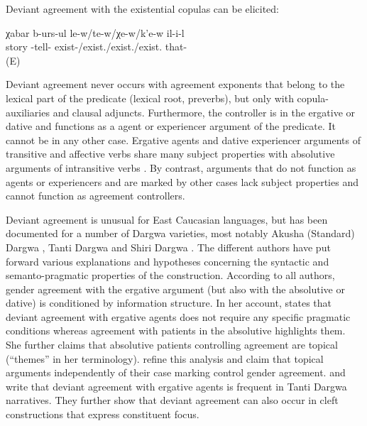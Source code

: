Deviant agreement with the existential copulas can be elicited:

\begin{exe}
	\ex	\label{ex:telling a storyLOCCOP}
	\gll	χabar	b-urs-ul	le-w\slash		te-w\slash		χe-w\slash		k'e-w	il-i-l\\
		story	-tell-	exist-\slash 	exist.\slash 	exist.\slash	exist.	that-\\
	\glt	{} (E)
\end{exe}


Deviant agreement never occurs with agreement exponents that belong to the lexical part of the predicate (lexical root, preverbs), but only with copula-auxiliaries and clausal adjuncts. Furthermore, the controller is in the ergative or dative and functions as a agent or experiencer argument of the predicate. It cannot be in any other case. Ergative agents and dative experiencer arguments of transitive and affective verbs share many subject properties with absolutive arguments of intransitive verbs \citep{Forker2017, Forker2019}. By contrast, arguments that do not function as agents or experiencers and are marked by other cases lack subject properties and cannot function as agreement controllers.

Deviant agreement is unusual for East Caucasian languages, but has been documented for a number of Dargwa varieties, most notably Akusha (Standard) Dargwa \citep{vandenBerg1999, GanenkovForthcoming}, Tanti Dargwa \citep[450]{Sumbatova.Lander2014} and Shiri Dargwa \citep{Belyaev2016, Belyaev2017a, Belyaev2017b}. The different authors have put forward various explanations and hypotheses concerning the syntactic and semanto-pragmatic properties of the construction. According to all authors, gender agreement with the ergative argument (but also with the absolutive or dative) is conditioned by information structure. In her account, \citet{vandenBerg1999} states that deviant agreement with ergative agents does not require any specific pragmatic conditions whereas agreement with patients in the absolutive highlights them. She further claims that absolutive patients controlling agreement are topical (``themes'' in her terminology). \citet{Sumbatova.Lander2014} refine this analysis and claim that topical arguments independently of their case marking control gender agreement. \citet{Sumbatova2010} and \citet{Sumbatova.Lander2014} write that deviant agreement with ergative agents is frequent in Tanti Dargwa narratives. They further show that deviant agreement can also occur in cleft constructions that express constituent focus.




